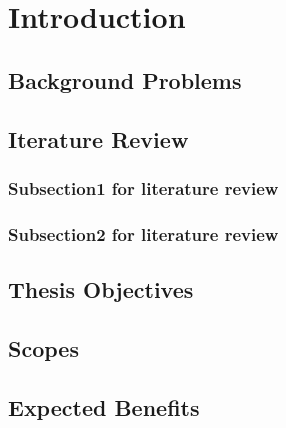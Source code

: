 \documentclass[thesis.tex]{subfiles}
\begin{document}
\chapter{Introduction}

\section{Background Problems}

\section{Iterature Review}

\subsection{Subsection1 for literature review}


\subsection{Subsection2 for literature review}


\section{Thesis Objectives}


\section{Scopes}


\section{Expected Benefits}
\end{document}
